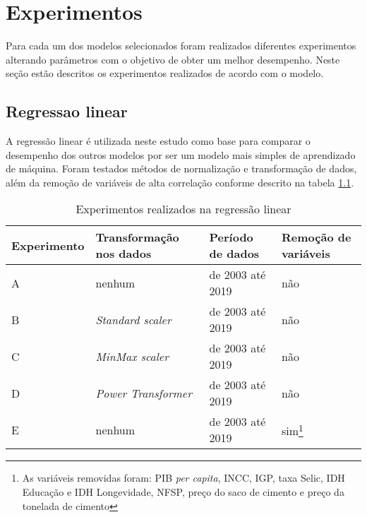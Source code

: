 
\chapter{Experimentos}
\label{chap:experimentos}

Para cada um dos modelos selecionados foram realizados diferentes experimentos
alterando parâmetros com o objetivo de obter um melhor 
desempenho. Neste seção estão descritos os experimentos realizados de acordo 
com o modelo.


\section{Regressao linear}

A regressão linear é utilizada 
neste estudo como base para comparar o desempenho dos
outros modelos por ser um modelo mais simples de aprendizado de máquina. 
Foram testados métodos de normalização  e transformação de 
dados, além da 
remoção de variáveis de alta correlação conforme 
descrito na tabela \ref{tab:exp-reg-lin}. 

\begin{table}
    \centering
    \caption{Experimentos realizados na regressão linear}
    \begin{tabular}{llll}
        \toprule
        Experimento & Transformação nos dados     & Período de dados & Remoção de variáveis  \\
        \midrule
        A           & nenhum & de 2003 até 2019            & não~                                     \\
        B           & \textit{Standard scaler}~            & de 2003 até 2019            & não~ ~                                   \\
        C           & \textit{MinMax scaler}~ ~            & de 2003 até 2019            & não~ ~ ~                                 \\
        D           & \textit{Power Transformer}           & de 2003 até 2019            & não                                      \\
        E           & nenhum & de 2003 até 2019            & sim\footnote{As variáveis removidas foram: PIB \textit{per capita}, INCC, IGP, taxa Selic, IDH Educação e IDH Longevidade, 
        NFSP, preço do saco de cimento e preço da tonelada de cimento}                                      \\
        \bottomrule
    \end{tabular}
    \label{tab:exp-reg-lin}
\end{table}


